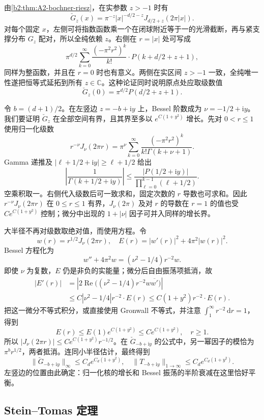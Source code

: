 \ProseParagraphBreak
由\cref{b2:thm:A2-bochner-riesz}，在实参数 \(z>-1\) 时有
\[
 \check G_z(x)
 =\pi^{-z}|x|^{-d/2-z}J_{d/2+z}(2\pi|x|).
\]
对每个固定 \(x\)，左侧可将指数函数乘一个在闭球附近等于一的光滑截断，再与紧支撑分布 \(G_z\) 配对，所以全纯依赖 \(z\)。右侧在 \(r=|x|\) 处可写成
\[
 \pi^{d/2}\sum_{k=0}^\infty
 \frac{(-\pi^2r^2)^k}{k!}\cdot P(k+d/2+z+1),
\]
同样为整函数，并且在 \(r=0\) 时也有意义。两侧在实区间 \(z>-1\) 一致，全纯唯一性遂把恒等式延拓到所有 \(z\in\mathbb C\)。这种论证同时说明原点处应取级数值
\[
 \check G_z(0)=\pi^{d/2}P(d/2+z+1).
\]

\ProseParagraphBreak
令 \(b=(d+1)/2\)。在左竖边 \(z=-b+\mathrm iy\) 上，Bessel 阶数成为
\(\nu=-1/2+\mathrm iy\)。我们要证明 \(\check G_z\) 在全部空间有界，且其界至多以 \(e^{C(1+y^2)}\) 增长。先对 \(0<r\leq1\) 使用归一化级数
\[
 r^{-\nu}J_\nu(2\pi r)
 =\pi^\nu\sum_{k=0}^\infty
 \frac{(-\pi^2r^2)^k}{k!\Gamma(k+\nu+1)}.
\]
Gamma 递推及 \(|\ell+1/2+\mathrm iy|\geq\ell+1/2\) 给出
\[
 \left|\frac1{\Gamma(k+1/2+\mathrm iy)}\right|
 \leq
 \frac{|P(1/2+\mathrm iy)|}
      {\prod_{\ell=0}^{k-1}(\ell+1/2)}.
\]
空乘积取一。右侧代入级数后可一致求和，固定次数的 \(r\) 导数也可求和。因此 \(r^{-\nu}J_\nu(2\pi r)\) 在 \(0\leq r\leq1\) 有界，\(J_\nu(2\pi)\) 及对 \(r\) 的导数在 \(r=1\) 的值也受 \(C e^{C(1+y^2)}\) 控制；微分中出现的 \(1+|\nu|\) 因子可并入同样的增长界。

\ProseParagraphBreak
大半径不再对级数取绝对值，而使用方程。令
\[
 w(r)=r^{1/2}J_\nu(2\pi r),\quad
 E(r)=|w'(r)|^2+4\pi^2|w(r)|^2.
\]
Bessel 方程化为
\[
 w''+4\pi^2w=(\nu^2-1/4)r^{-2}w.
\]
即使 \(\nu\) 为复数，\(E\) 仍是非负的实能量；微分后自由振荡项抵消，故
\[
 \begin{aligned}
 |E'(r)|
 &=\left|2\operatorname{Re}
   \bigl((\nu^2-1/4)r^{-2}w\overline{w'}\bigr)\right|\\
 &\leq C|\nu^2-1/4|r^{-2}\cdot E(r)
 \leq C(1+y^2)r^{-2}\cdot E(r).
 \end{aligned}
\]
把这一微分不等式积分，或直接使用 Gronwall 不等式，并注意 \(\int_1^\infty r^{-2}\,\mathrm dr=1\)，得到
\[
 E(r)\leq E(1)e^{C(1+y^2)}
 \leq C e^{C(1+y^2)},\quad r\geq1.
\]
所以 \(|J_\nu(2\pi r)|\leq C e^{C(1+y^2)}r^{-1/2}\)。在 \(\check G_{-b+\mathrm iy}\) 的公式中，另一幂因子的模恰为 \(\pi^b r^{1/2}\)，两者抵消。连同小半径估计，最终得到
\[
 \|\check G_{-b+\mathrm iy}\|_\infty
 \leq C_d e^{C_d(1+y^2)},\quad
 \|T_{-b+\mathrm iy}\|_{1\to\infty}
 \leq C_d e^{C_d(1+y^2)}.
\]
左竖边的位置由此确定：归一化核的增长和 Bessel 振荡的半阶衰减在这里恰好平衡。

\subsection{Stein–Tomas 定理}
\label{b2:subsec:230403}


